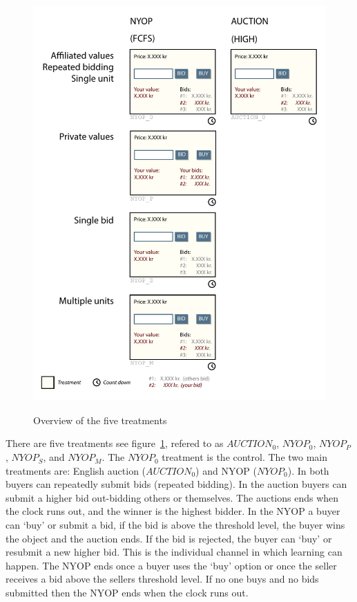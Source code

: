 \documentclass[a4paper,12pt]{article}
\begin{document}
	\begin{figure}
	        \centering
	        \caption{Overview of the five treatments}
	        \includegraphics[width=\textwidth]{Figures/Treatments}
			\label{fig:treatments}
	\end{figure}

	There are five treatments see figure~\ref{fig:treatments}, refered to as $AUCTION_0$, $NYOP_0$, $NYOP_P$, $NYOP_S$, and $NYOP_M$. The $NYOP_0$ treatment is the control. The two main treatments are: English auction ($AUCTION_0$) and NYOP ($NYOP_0$).
	In both buyers can repeatedly submit bids (repeated bidding). In the auction buyers can submit a higher bid out-bidding others or themselves. The auctions ends when the clock runs out, and the winner is the highest bidder. In the NYOP a buyer can `buy' or submit a bid, if the bid is above the threshold level, the buyer wins the object and the auction ends. If the bid is rejected, the buyer can `buy' or resubmit a new higher bid. This is the individual channel in which learning can happen. The NYOP ends once a buyer uses the `buy' option or once the seller receives a bid above the sellers threshold level. If no one buys and no bids submitted then the NYOP ends when the clock runs out.
\end{document}
